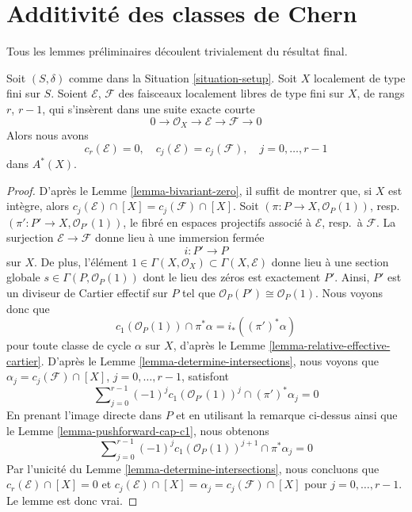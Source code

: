 \section{Additivité des classes de Chern}
\label{section-additivity-chern-classes}

\noindent
Tous les lemmes préliminaires découlent trivialement du
résultat final.

\begin{lemma}
\label{lemma-get-rid-of-trivial-subbundle}
Soit $(S, \delta)$ comme dans la Situation \ref{situation-setup}.
Soit $X$ localement de type fini sur $S$.
Soient $\mathcal{E}$, $\mathcal{F}$ des faisceaux localement libres de type fini
sur $X$, de rangs $r$, $r - 1$, qui s'insèrent dans une suite
exacte courte
$$
0 \to \mathcal{O}_X \to \mathcal{E} \to \mathcal{F} \to 0
$$
Alors nous avons
$$
c_r(\mathcal{E}) = 0, \quad
c_j(\mathcal{E}) = c_j(\mathcal{F}), \quad j = 0, \ldots, r - 1
$$
dans $A^*(X)$.
\end{lemma}

\begin{proof}
D'après le Lemme \ref{lemma-bivariant-zero},
il suffit de montrer que, si $X$ est intègre,
alors $c_j(\mathcal{E}) \cap [X] = c_j(\mathcal{F}) \cap [X]$.
Soit $(\pi : P \to X, \mathcal{O}_P(1))$,
resp.\ $(\pi' : P' \to X, \mathcal{O}_{P'}(1))$, le
fibré en espaces projectifs associé à $\mathcal{E}$, resp.\ à $\mathcal{F}$.
La surjection $\mathcal{E} \to \mathcal{F}$ donne lieu
à une immersion fermée
$$
i : P' \longrightarrow P
$$
sur $X$. De plus, l'élément
$1 \in \Gamma(X, \mathcal{O}_X) \subset \Gamma(X, \mathcal{E})$
donne lieu à une section globale $s \in \Gamma(P, \mathcal{O}_P(1))$
dont le lieu des zéros est exactement $P'$. Ainsi, $P'$ est un diviseur de Cartier effectif
sur $P$ tel que $\mathcal{O}_P(P') \cong \mathcal{O}_P(1)$.
Nous voyons donc que
$$
c_1(\mathcal{O}_P(1)) \cap \pi^*\alpha = i_*((\pi')^*\alpha)
$$
pour toute classe de cycle $\alpha$ sur $X$, d'après le
Lemme \ref{lemma-relative-effective-cartier}.
D'après le Lemme \ref{lemma-determine-intersections}, nous voyons que
$\alpha_j = c_j(\mathcal{F}) \cap [X]$, $j = 0, \ldots, r - 1$,
satisfont
$$
\sum\nolimits_{j = 0}^{r - 1} (-1)^jc_1(\mathcal{O}_{P'}(1))^j
\cap (\pi')^*\alpha_j = 0
$$
En prenant l'image directe dans $P$ et en utilisant la remarque ci-dessus ainsi que le
Lemme \ref{lemma-pushforward-cap-c1}, nous obtenons
$$
\sum\nolimits_{j = 0}^{r - 1}
(-1)^j c_1(\mathcal{O}_P(1))^{j + 1}
\cap \pi^*\alpha_j = 0
$$
Par l'unicité du Lemme \ref{lemma-determine-intersections},
nous concluons que
$c_r(\mathcal{E}) \cap [X] = 0$ et
$c_j(\mathcal{E}) \cap [X] = \alpha_j = c_j(\mathcal{F}) \cap [X]$
pour $j = 0, \ldots, r - 1$. Le lemme est donc vrai.
\end{proof}

